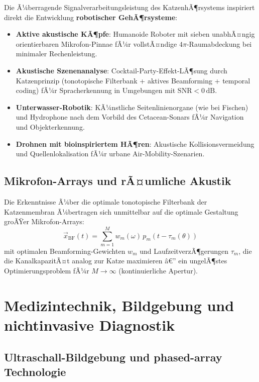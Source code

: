﻿\documentclass[12pt,a4paper,titlepage]{report}
\begin{document}
Die Ã¼berragende Signalverarbeitungsleistung des KatzenhÃ¶rsystems inspiriert
direkt die Entwicklung \textbf{robotischer GehÃ¶rsysteme}:
\begin{itemize}[leftmargin=2em]
    \item \textbf{Aktive akustische KÃ¶pfe}: Humanoide Roboter mit sieben
        unabhÃ¤ngig orientierbaren Mikrofon-Pinnae fÃ¼r vollstÃ¤ndige $4\pi$-Raumabdeckung
        bei minimaler Rechenleistung.
    \item \textbf{Akustische Szenenanalyse}: Cocktail-Party-Effekt-LÃ¶sung
        durch Katzenprinzip (tonotopische Filterbank + aktives Beamforming +
        temporal coding) fÃ¼r Spracherkennung in Umgebungen mit $\text{SNR} < 0\,\text{dB}$.
    \item \textbf{Unterwasser-Robotik}: KÃ¼nstliche Seitenlinienorgane (wie bei
        Fischen) und Hydrophone nach dem Vorbild des Cetacean-Sonars fÃ¼r
        Navigation und Objekterkennung.
    \item \textbf{Drohnen mit bioinspiriertem HÃ¶ren}: Akustische Kollisionsvermeidung
        und Quellenlokalisation fÃ¼r urbane Air-Mobility-Szenarien.
\end{itemize}

\subsection{Mikrofon-Arrays und rÃ¤umliche Akustik}

Die Erkenntnisse Ã¼ber die optimale tonotopische Filterbank der Katzenmembran
Ã¼bertragen sich unmittelbar auf die optimale Gestaltung groÃŸer Mikrofon-Arrays:
\[
    \vec{x}_{\text{BF}}(t) = \sum_{m=1}^{M} w_m(\omega)\, p_m(t - \tau_m(\theta))
\]
mit optimalen Beamforming-Gewichten $w_m$ und LaufzeitverzÃ¶gerungen $\tau_m$, die
die KanalkapazitÃ¤t analog zur Katze maximieren â€” ein ungelÃ¶stes Optimierungsproblem
fÃ¼r $M \to \infty$ (kontinuierliche Apertur).

\section{Medizintechnik, Bildgebung und nichtinvasive Diagnostik}

\subsection{Ultraschall-Bildgebung und phased-array Technologie}
\end{document}
